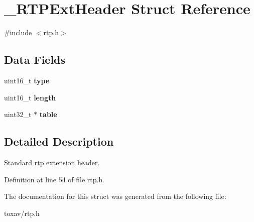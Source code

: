 \hypertarget{struct___r_t_p_ext_header}{\section{\+\_\+\+R\+T\+P\+Ext\+Header Struct Reference}
\label{struct___r_t_p_ext_header}
}


{\ttfamily \#include $<$rtp.\+h$>$}

\subsection*{Data Fields}
\begin{DoxyCompactItemize}
\item 
\hypertarget{struct___r_t_p_ext_header_acb5cfd209ba75c853d03f701e7f91679}{uint16\+\_\+t {\bfseries type}}\label{struct___r_t_p_ext_header_acb5cfd209ba75c853d03f701e7f91679}

\item 
\hypertarget{struct___r_t_p_ext_header_a1892eba2086d12ac2b09005aeb09ea3b}{uint16\+\_\+t {\bfseries length}}\label{struct___r_t_p_ext_header_a1892eba2086d12ac2b09005aeb09ea3b}

\item 
\hypertarget{struct___r_t_p_ext_header_a05be6af94bcc30c135e4b6089bf9cfd9}{uint32\+\_\+t $\ast$ {\bfseries table}}\label{struct___r_t_p_ext_header_a05be6af94bcc30c135e4b6089bf9cfd9}

\end{DoxyCompactItemize}


\subsection{Detailed Description}
Standard rtp extension header. 

Definition at line 54 of file rtp.\+h.



The documentation for this struct was generated from the following file\+:\begin{DoxyCompactItemize}
\item 
toxav/rtp.\+h\end{DoxyCompactItemize}
